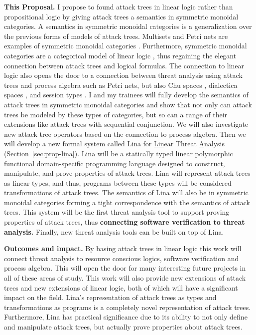 \begin{full}
\textbf{This Proposal.} I propose to found attack trees in linear
logic rather than propositional logic by giving attack trees a
semantics in symmetric monoidal categories.  A semantics in symmetric
monoidal categories is a generalization over the previous forms of
models of attack trees.  Multisets and Petri nets are examples of
symmetric monoidal categories \cite{Brown:1991,Tzouvaras:1998}.
Furthermore, symmetric monoidal categories are a categorical model of
linear logic \cite{dePaiva:2014}, thus regaining the elegant
connection between attack trees and logical formulas.  The connection
to linear logic also opens the door to a connection between threat
analysis using attack trees and process algebra such as Petri nets,
but also Chu spaces \cite{Pratt:1999}, dialectica spaces
\cite{dePaiva:2006b}, and session types
\cite{Wadler:2012,Caires:2010}.  I and my trainees will fully develop
the semantics of attack trees in symmetric monoidal categories and
show that not only can attack trees be modeled by these types of
categories, but so can a range of their extensions like attack trees
with sequential conjunction.  We will also investigate new attack tree
operators based on the connection to process algebra.  Then we will
develop a new formal system called Lina for \underline{Lin}ear Threat
\underline{A}nalysis (Section~\ref{sec:prop-lina}).  Lina will be a
statically typed linear polymorphic functional domain-specific
programming language designed to construct, manipulate, and prove
properties of attack trees.  Lina will represent attack trees as
linear types, and thus, programs between these types will be
considered transformations of attack trees.  The semantics of Lina
will also be in symmetric monoidal categories forming a tight
correspondence with the semantics of attack trees.  This system will
be the first threat analysis tool to support proving properties of
attack trees, thus \textbf{connecting software verification to threat
  analysis.}  Finally, new threat analysis tools can be built on top
of Lina.

\textbf{Outcomes and impact.}  By basing attack trees in linear logic
this work will connect threat analysis to resource conscious logics,
software verification and process algebra.  This will open the door
for many interesting future projects in all of these areas of study.
This work will also provide new extensions of attack trees and new
extensions of linear logic, both of which will have a significant
impact on the field.  Lina's representation of attack trees as types
and transformations as programs is a completely novel representation
of attack trees.  Furthermore, Lina has practical significance due to
its ability to not only define and manipulate attack trees, but
actually prove properties about attack trees.


\end{full}
